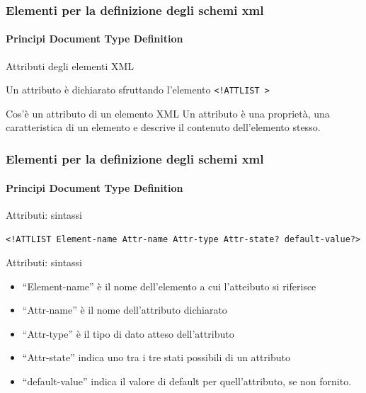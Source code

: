 \begin{frame}
    \frametitle{Elementi per la definizione degli schemi xml}
    \framesubtitle{Principi Document Type Definition}
    \addtocounter{nframe}{1}

    \begin{block}{Attributi degli elementi XML}
    \begin{center} Un attributo è dichiarato sfruttando l'elemento \texttt{<!ATTLIST >} \end{center}
    \end{block}

    \begin{block}{Cos'è un attributo di un elemento XML}
        Un attributo è una proprietà, una caratteristica di un elemento e descrive il contenuto dell'elemento stesso.
    \end{block}

\end{frame}

\begin{frame}
    \frametitle{Elementi per la definizione degli schemi xml}
    \framesubtitle{Principi Document Type Definition}
    \addtocounter{nframe}{1}

    \begin{block}{Attributi: sintassi}
    \begin{center} \texttt{<!ATTLIST Element-name Attr-name Attr-type Attr-state? default-value?>} \end{center}
    \end{block}

    \begin{block}{Attributi: sintassi}
        \begin{itemize}
            \item ``Element-name'' è il nome dell'elemento a cui l'atteibuto si riferisce
            \item ``Attr-name'' è il nome dell'attributo dichiarato
            \item ``Attr-type'' è il tipo di dato atteso dell'attributo
            \item ``Attr-state'' indica uno tra i tre stati possibili di un attributo 
            \item ``default-value'' indica il valore di default per quell'attributo, se non fornito.
        \end{itemize}
    \end{block}

\end{frame}

